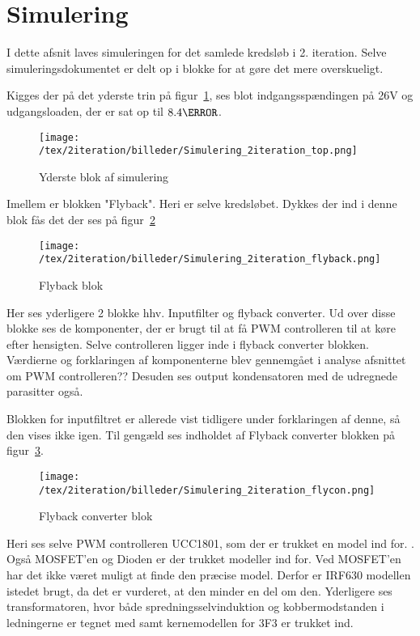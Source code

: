 \section{Simulering}

I dette afsnit laves simuleringen for det samlede kredsløb i 2. iteration. 
Selve simuleringsdokumentet er delt op i blokke for at gøre det mere overskueligt. 


\noindent Kigges der på det yderste trin på figur~\ref{fig: simtop}, ses blot indgangsspændingen på 26V og udgangsloaden, der er sat op til $8.4\ohm$.
\begin{figure}[H]
	\center
	\texttt{[image: /tex/2iteration/billeder/Simulering\_2iteration\_top.png]}
	\caption{Yderste blok af simulering}
	\label{fig: simtop}
\end{figure}
Imellem er blokken "Flyback". Heri er selve kredsløbet. Dykkes der ind i denne blok fås det der ses på figur~\ref{fig: simfly} 
\begin{figure}[H]
	\center
	\texttt{[image: /tex/2iteration/billeder/Simulering\_2iteration\_flyback.png]}
	\caption{Flyback blok}
	\label{fig: simfly}
\end{figure}
Her ses yderligere 2 blokke hhv. Inputfilter og flyback converter. Ud over disse blokke ses de komponenter, der er brugt til at få PWM controlleren til at køre efter hensigten. Selve controlleren ligger inde i flyback converter blokken. Værdierne og forklaringen af komponenterne blev gennemgået i analyse afsnittet om PWM controlleren??
Desuden ses output kondensatoren med de udregnede parasitter også.


\noindent Blokken for inputfiltret er allerede vist tidligere under forklaringen af denne, så den vises ikke igen. Til gengæld ses indholdet af Flyback converter blokken på figur~\ref{fig: simflycon}. 
\begin{figure}[H]
	\center
	\texttt{[image: /tex/2iteration/billeder/Simulering\_2iteration\_flycon.png]}
	\caption{Flyback converter blok}
	\label{fig: simflycon}
\end{figure}
Heri ses selve PWM controlleren UCC1801, som der er trukket en model ind for. \cite{??}. Også MOSFET'en og Dioden er der trukket modeller ind for. Ved MOSFET'en har det ikke været muligt at finde den præcise model. Derfor er IRF630 modellen istedet brugt, da det er vurderet, at den minder en del om den\cite{IRF630}. 
Yderligere ses transformatoren, hvor både spredningsselvinduktion og kobbermodstanden i ledningerne er tegnet med samt kernemodellen for 3F3 er trukket ind.

